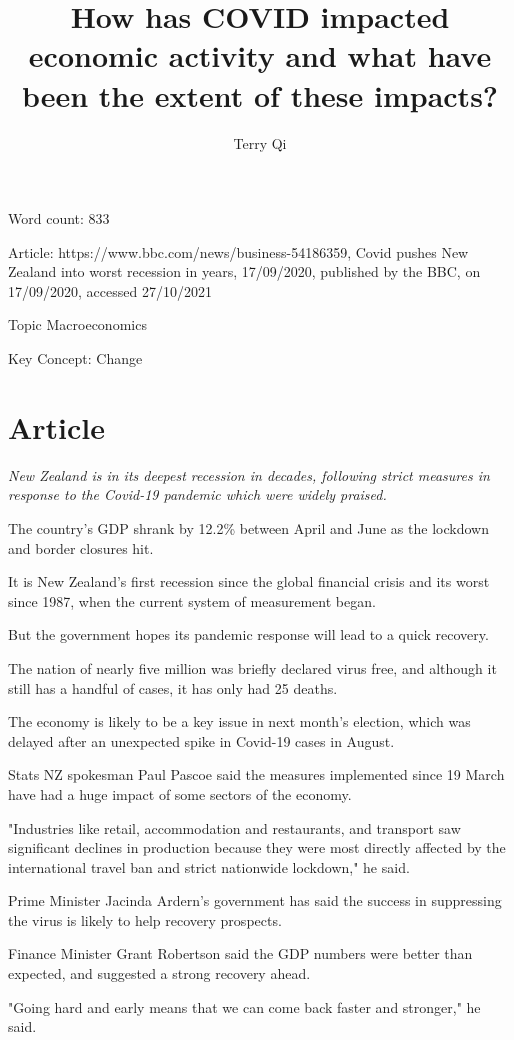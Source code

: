 \documentclass[a4paper,12pt]{article}
\title{How has COVID impacted economic activity and what have been the extent of these impacts?}
\author{Terry Qi}
\begin{document}
\maketitle
\newpage
Word count: 833

Article: https://www.bbc.com/news/business-54186359, Covid pushes New Zealand into worst recession in years, 17/09/2020, published by the BBC, on 17/09/2020, accessed 27/10/2021

Topic Macroeconomics

Key Concept: Change

\section*{Article}

\textit{New Zealand is in its deepest recession in decades, following strict measures in response to the Covid-19 pandemic which were widely praised.}

The country's GDP shrank by 12.2\% between April and June as the lockdown and border closures hit.

It is New Zealand's first recession since the global financial crisis and its worst since 1987, when the current system of measurement began.

But the government hopes its pandemic response will lead to a quick recovery.

The nation of nearly five million was briefly declared virus free, and although it still has a handful of cases, it has only had 25 deaths.

The economy is likely to be a key issue in next month's election, which was delayed after an unexpected spike in Covid-19 cases in August.

Stats NZ spokesman Paul Pascoe said the measures implemented since 19 March have had a huge impact of some sectors of the economy.

"Industries like retail, accommodation and restaurants, and transport saw significant declines in production because they were most directly affected by the international travel ban and strict nationwide lockdown," he said.

Prime Minister Jacinda Ardern's government has said the success in suppressing the virus is likely to help recovery prospects.

Finance Minister Grant Robertson said the GDP numbers were better than expected, and suggested a strong recovery ahead.

"Going hard and early means that we can come back faster and stronger," he said.
\end{document}
